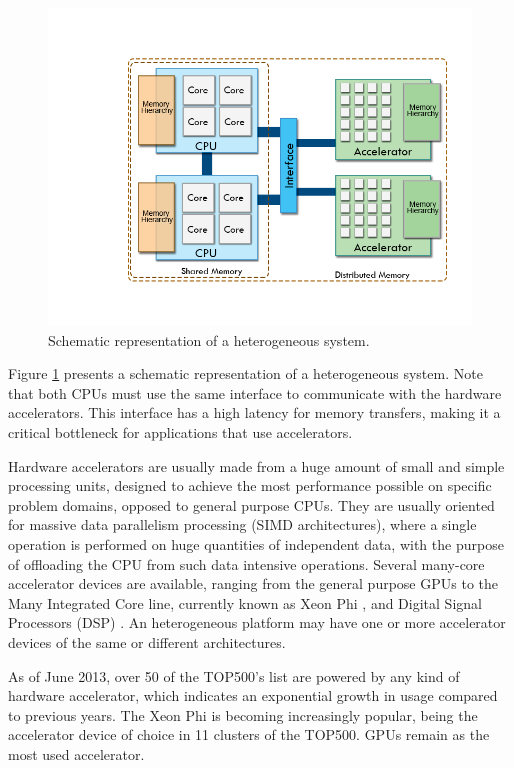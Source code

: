 \begin{figure}[!htp]
	\begin{center}
		\includegraphics[scale=0.4]{../../common/img/hetplats2.png}
		\caption{Schematic representation of a heterogeneous system.}
		\label{fig:HeterogeneousSystem}
	\end{center}
\end{figure}

Figure \ref{fig:HeterogeneousSystem} presents a schematic representation of a heterogeneous system. Note that both CPUs must use the same interface to communicate with the hardware accelerators. This interface has a high latency for memory transfers, making it a critical bottleneck for applications that use accelerators.

Hardware accelerators are usually made from a huge amount of small and simple processing units, designed to achieve the most performance possible on specific problem domains, opposed to general purpose CPUs. They are usually oriented for massive data parallelism processing (SIMD architectures), where a single operation is performed on huge quantities of independent data, with the purpose of offloading the CPU from such data intensive operations. Several many-core accelerator devices are available, ranging from the general purpose GPUs to the \intel Many Integrated Core line, currently known as \intel Xeon Phi \cite{Intel:MIC}, and Digital Signal Processors (DSP) \cite{Texas:DSP}. An heterogeneous platform may have one or more accelerator devices of the same or different architectures.

As of June 2013, over 50 of the TOP500’s list \cite{TOP500} are powered by any kind of hardware accelerator, which indicates an exponential growth in usage compared to previous years. The \intel Xeon Phi is becoming increasingly popular, being the accelerator device of choice in 11 clusters of the TOP500. \nvidia GPUs remain as the most used accelerator.


